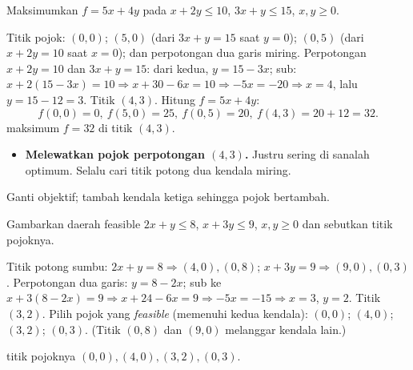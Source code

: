 \begin{soalbox}{}
Maksimumkan $f=5x+4y$ pada $x+2y\le10$, $3x+y\le15$, $x,y\ge0$.
\end{soalbox}

\jawab
{} Titik pojok: $(0,0)$; $(5,0)$ (dari $3x+y=15$ saat $y=0$); $(0,5)$
(dari $x+2y=10$ saat $x=0$); dan perpotongan dua garis miring.
 Perpotongan $x+2y=10$ dan $3x+y=15$: dari kedua, $y=15-3x$; sub:
$x+2(15-3x)=10\Rightarrow x+30-6x=10\Rightarrow -5x=-20\Rightarrow x=4$, lalu
$y=15-12=3$. Titik $(4,3)$.
 Hitung $f=5x+4y$:
\[
f(0,0)=0,\ f(5,0)=25,\ f(0,5)=20,\ f(4,3)=20+12=32.
\]
\jadi maksimum $f=32$ di titik $(4,3)$.

\begin{jebakan}
\begin{itemize}[leftmargin=*,topsep=2pt]
  \item \textbf{Melewatkan pojok perpotongan $(4,3)$.} Justru sering di sanalah
  optimum. Selalu cari titik potong dua kendala miring.
\end{itemize}
\end{jebakan}

\begin{variasi}
Ganti objektif; tambah kendala ketiga sehingga pojok bertambah.
\end{variasi}

\begin{soalbox}{}
Gambarkan daerah feasible $2x+y\le8$, $x+3y\le9$, $x,y\ge0$ dan sebutkan titik
pojoknya.
\end{soalbox}

\jawab
{} Titik potong sumbu: $2x+y=8\Rightarrow(4,0),(0,8)$;
$x+3y=9\Rightarrow(9,0),(0,3)$.
 Perpotongan dua garis: $y=8-2x$; sub ke $x+3(8-2x)=9\Rightarrow
x+24-6x=9\Rightarrow -5x=-15\Rightarrow x=3$, $y=2$. Titik $(3,2)$.
 Pilih pojok yang \emph{feasible} (memenuhi kedua kendala): $(0,0)$;
$(4,0)$; $(3,2)$; $(0,3)$. (Titik $(0,8)$ dan $(9,0)$ melanggar kendala lain.)

\begin{center}
\end{center}
\jadi titik pojoknya $(0,0),(4,0),(3,2),(0,3)$.

